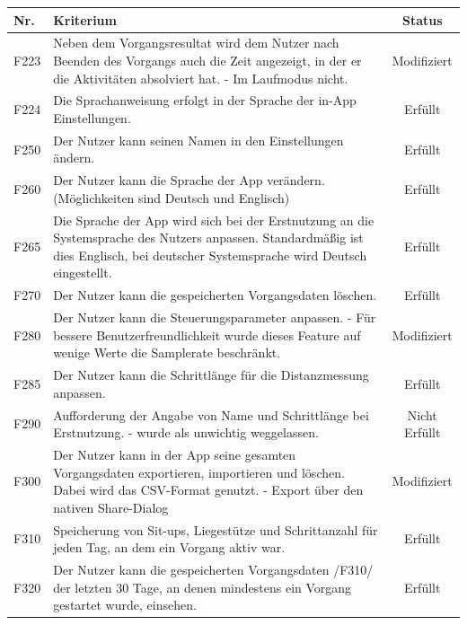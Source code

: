 \documentclass[a4paper,12pt]{article}
\begin{document}
\begin{center}
	\begin{tabular}{ |m{1cm}| m{11cm} | c | } 
		\hline
		\textbf{Nr.} & \textbf{Kriterium} & \textbf{Status}
	\\	\hline   F223 & Neben dem Vorgangsresultat wird dem Nutzer nach Beenden des Vorgangs auch die Zeit angezeigt, in der er die Aktivitäten absolviert hat. - Im Laufmodus nicht.
	&    \cellcolor{blue!25} Modifiziert 
	\\  \hline   F224 & Die Sprachanweisung erfolgt in der Sprache der in-App Einstellungen.
	&    \cellcolor{green!25} Erfüllt 
	\\  \hline   F250 & Der Nutzer kann seinen Namen in den Einstellungen ändern.
	&    \cellcolor{green!25} Erfüllt 
	\\  \hline   F260 & Der Nutzer kann die Sprache der App verändern. (Möglichkeiten sind Deutsch und Englisch)
	&    \cellcolor{green!25} Erfüllt 
	\\  \hline   F265 & Die Sprache der App wird sich bei der Erstnutzung an die Systemsprache des Nutzers anpassen. Standardmäßig ist dies Englisch, bei deutscher Systemsprache wird Deutsch eingestellt.
	&    \cellcolor{green!25} Erfüllt 
	\\  \hline   F270 & Der Nutzer kann die gespeicherten Vorgangsdaten löschen.
	&    \cellcolor{green!25} Erfüllt 
	\\  \hline   F280 & Der Nutzer kann die Steuerungsparameter anpassen. - Für bessere Benutzerfreundlichkeit wurde dieses Feature auf wenige Werte die Samplerate beschränkt.
	&    \cellcolor{blue!25} Modifiziert
	\\  \hline   F285 & Der Nutzer kann die Schrittlänge für die Distanzmessung anpassen.
	&    \cellcolor{green!25} Erfüllt 
	\\  \hline   F290 & Aufforderung der Angabe von Name und Schrittlänge bei Erstnutzung. - wurde als unwichtig weggelassen.
	&    \cellcolor{red!25} Nicht Erfüllt
	\\  \hline   F300 & Der Nutzer kann in der App seine gesamten Vorgangsdaten exportieren, importieren und löschen. Dabei wird das CSV-Format genutzt. - Export über den nativen Share-Dialog
	&    \cellcolor{green!25} Modifiziert 
	\\  \hline   F310 & Speicherung von Sit-ups, Liegestütze und Schrittanzahl für jeden Tag, an dem ein Vorgang aktiv war.
	&    \cellcolor{green!25} Erfüllt 
	\\  \hline   F320 & Der Nutzer kann die gespeicherten Vorgangsdaten /F310/ der letzten 30 Tage, an denen mindestens ein Vorgang gestartet wurde, einsehen. 
	&	 \cellcolor{green!25} Erfüllt 
	\\
	\hline
\end{tabular}
\end{center}
\vspace{1cm}
\end{document}
